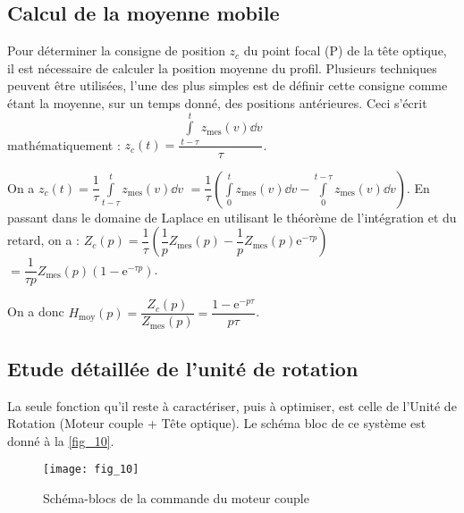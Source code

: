 \subsection{Calcul de la moyenne mobile}
\ifprof
\else
Pour déterminer la consigne de position $z_c$ du point focal (P) de la tête optique, il est nécessaire de
calculer la position moyenne du profil. Plusieurs techniques peuvent être utilisées, l’une des plus simples
est de définir cette consigne comme étant la moyenne, sur un temps donné, des positions antérieures. Ceci
s’écrit mathématiquement : $z_c(t)=\dfrac{\int\limits_{t-\tau}^{t}z_{\text{mes}}(v)\dd v}{\tau}$.
\fi




\ifprof
\begin{corrige}
On a $z_c(t)=\dfrac{1}{\tau} \int\limits_{t-\tau}^{t}z_{\text{mes}}(v)\dd v$ 
$=\dfrac{1}{\tau} \left( \int\limits_{0}^{t}z_{\text{mes}}(v)\dd v - \int\limits_{0}^{t-\tau}z_{\text{mes}}(v)\dd v \right)$. En passant dans le domaine de Laplace en utilisant le théorème de l'intégration et du retard, on a : 
$Z_c(p)=\dfrac{1}{\tau} \left( \dfrac{1}{p}Z_{\text{mes}}(p)- \dfrac{1}{p}Z_{\text{mes}}(p)\text{e}^{-\tau p}  \right)$$=\dfrac{1}{\tau p} Z_{\text{mes}}(p)\left( 1- \text{e}^{-\tau p}  \right)$.

On a donc $H_{\text{moy}}(p) = \dfrac{Z_c(p)}{Z_{\text{mes}}(p)}=\dfrac{1-\text{e}^{-p\tau}}{p \tau}$.

\end{corrige}
\else
\fi

\subsection{Etude détaillée de l'unité de rotation}

\ifprof
\else

La seule fonction qu’il reste à caractériser, puis à optimiser, est celle de l’Unité de Rotation (Moteur
couple + Tête optique). Le schéma bloc de ce système est donné à la \autoref{fig_10}.


\begin{figure}[H]
\centering
\texttt{[image: fig\_10]}
\caption{\label{fig_10} Schéma-blocs de la commande du moteur couple}
\end{figure}


